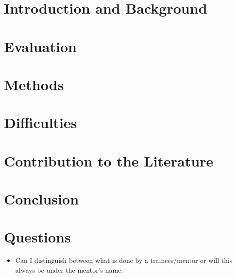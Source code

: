 \documentclass[12pt]{memoir}
\begin{document}


\tableofcontents
\clearpage

\chapter{Introduction and Background}


\chapter{Evaluation}


\chapter{Methods}


\chapter{Difficulties}


\chapter{Contribution to the Literature}


\chapter{Conclusion}


\chapter{Questions}
\begin{itemize}
    \item Can I distinguish between what is done by a trainees/mentor or will this always be under the mentor's name.
\end{itemize}
\end{document}
